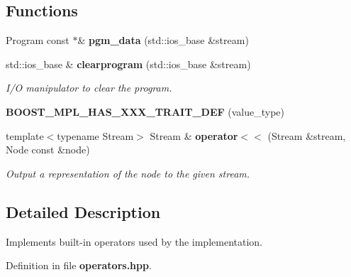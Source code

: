 \subsection*{Functions}
\begin{CompactItemize}
\item 
Program const $\ast$\& {\bf pgm\_\-data} (std::ios\_\-base \&stream)\label{namespacesprite_1_1manipulators_1_1detail_a0}

\item 
std::ios\_\-base \& {\bf clearprogram} (std::ios\_\-base \&stream)\label{namespacesprite_1_1manipulators_a0}

\begin{CompactList}\small\item\em I/O manipulator to clear the program. \item\end{CompactList}\item 
{\bf BOOST\_\-MPL\_\-HAS\_\-XXX\_\-TRAIT\_\-DEF} (value\_\-type)\label{namespacesprite_1_1meta_a0}

\item 
template$<$typename Stream$>$ Stream \& {\bf operator$<$$<$} (Stream \&stream, Node const \&node)\label{namespacesprite_1_1operators_a0}

\begin{CompactList}\small\item\em Output a representation of the node to the given stream. \item\end{CompactList}\end{CompactItemize}


\subsection{Detailed Description}
Implements built-in operators used by the implementation. 



Definition in file {\bf operators.hpp}.